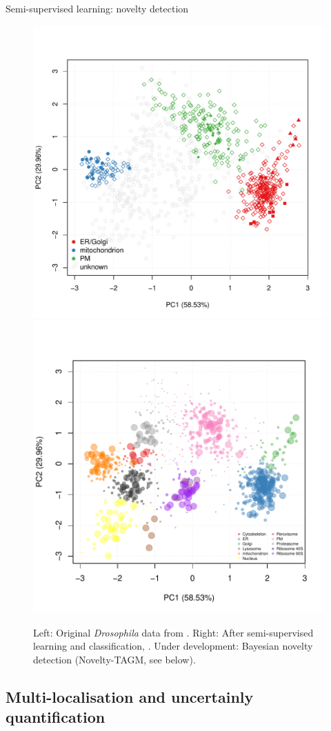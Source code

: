 \documentclass{beamer}
\theoremstyle{example}
\begin{document}
\begin{frame}{Semi-supervised learning: novelty detection}
  \begin{figure}
    \includegraphics[width=.48\linewidth]{figs/tan2009r1org.pdf}
    \includegraphics[width=.5\linewidth]{figs/pdres2fig.pdf}
    \caption{Left: Original \textit{Drosophila} data from
      \cite{Tan2009}. Right: After semi-supervised learning and
      classification, \cite{Breckels:2013}. Under development:
      Bayesian novelty detection (Novelty-TAGM, see below).}
  \end{figure}
\end{frame}



\subsection{Multi-localisation and uncertainly quantification}
\end{document}
